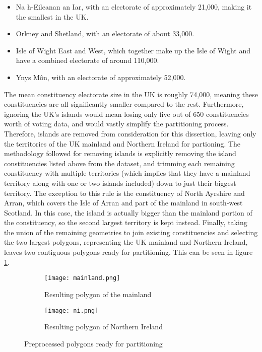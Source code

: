 \documentclass{article}
\begin{document}
\begin{itemize}
    \item Na h-Eileanan an Iar, with an electorate of approximately 21,000, making it the smallest in the UK.
    \item Orkney and Shetland, with an electorate of about 33,000.
    \item Isle of Wight East and West, which together make up the Isle of Wight and have a combined electorate of around 110,000.
    \item Ynys Môn, with an electorate of approximately 52,000.
\end{itemize}

The mean constituency electorate size in the UK is roughly 74,000, meaning these constituencies are all significantly smaller compared to the rest. Furthermore,
ignoring the UK's islands would mean losing only five out of 650 constituencies worth of voting data, and would vastly simplify the partitioning process. Therefore,
islands are removed from consideration for this dissertion, leaving only the territories of the UK mainland and Northern Ireland for partioning. The methodology 
followed for removing islands is explicitly removing the island constituencies listed above from the dataset, and trimming each remaining constituency with multiple territories
 (which implies that they have a mainland territory along with one or two islands included) down to just their biggest territory. The exception to this rule is the constituency
of North Ayrshire and Arran, which covers the Isle of Arran and part of the mainland in south-west Scotland. In this case, the island is actually bigger than the mainland portion
of the constituency, so the second largest territory is kept instead. Finally, taking the union of the remaining geometries to join existing constituencies and selecting the two largest polygons, representing
the UK mainland and Northern Ireland, leaves two contiguous polygons ready for partitioning. This can be seen in figure \ref{fig:preprocessedpolygons}.


\begin{figure}[H]
    \centering
    \begin{subfigure}{0.48\textwidth}
        \centering
        \texttt{[image: mainland.png]}
        \caption{Resulting polygon of the mainland}
    \end{subfigure}
    \begin{subfigure}{0.48\textwidth}
        \centering
        \texttt{[image: ni.png]}
        \caption{Resulting polygon of Northern Ireland}
    \end{subfigure}
    \caption{Preprocessed polygons ready for partitioning}
    \label{fig:preprocessedpolygons}
\end{figure}
\end{document}
